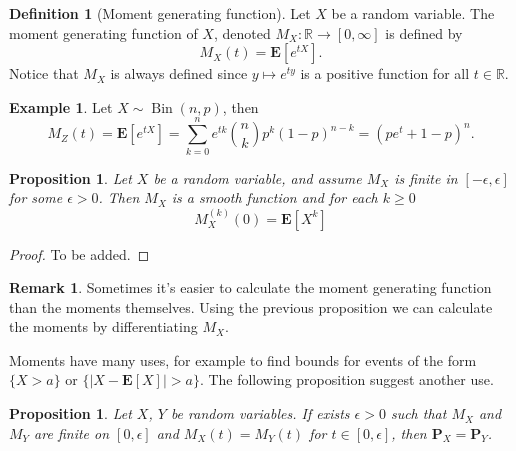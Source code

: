 \documentclass[11pt,a4paper]{article}
\theoremstyle{definition}
\newtheorem{definition}{Definition}[section]
\newtheorem{remark}{Remark}[section]
\newtheorem{example}{Example}[section]
\theoremstyle{plain}
\newtheorem{proposition}[theorem]{Proposition}
\DeclareMathOperator{\Bin}{Bin}
\newcommand{\R}{\mathbb{R}}
\newcommand{\abs}[1]{\left\lvert #1\right\rvert}
\begin{document}
  \begin{definition}[Moment generating function]
    Let $X$ be a random variable. The moment generating function of $X$,
    denoted $M_X \colon \R \to [0,\infty]$ is defined by
    \[
      M_X(t) = \mathbf E\left[e^{tX}\right].
    \]
    Notice that $M_X$ is always defined since $y \mapsto e^{ty}$ is a positive
    function for all $t \in \R$.
  \end{definition}

  \begin{example}
    Let $X \sim \Bin(n,p)$, then
    \[
      M_Z(t) =
      \mathbf E\left[e^{tX}\right] =
      \sum_{k=0}^{n}e^{t k}{\binom{n}{k}}p^{k}(1-p)^{n-k} =
      \left(p e^{t}+1-p\right)^{n}.
    \]
  \end{example}

  \begin{proposition}
    Let $X$ be a random variable, and assume $M_X$ is finite in 
    $[-\epsilon, \epsilon]$ for some $\epsilon > 0$. Then $M_X$ is a smooth
    function and for each $k \geq 0$
    \[
      M_X^{(k)}(0) = \mathbf E\left[X^k\right]
    \]
  \end{proposition}
  \begin{proof}
    To be added.
  \end{proof}

  \begin{remark}
    Sometimes it's easier to calculate the moment generating function than
    the moments themselves. Using the previous proposition we can calculate
    the moments by differentiating $M_X$.
  \end{remark}

  Moments have many uses, for example to find bounds for events of the
  form $\{X > a\}$ or $\{\abs{X - \mathbf E[X]} > a\}$. The following
  proposition suggest another use.

  \begin{proposition}
    Let $X$, $Y$ be random variables. If exists $\epsilon > 0$ such that 
    $M_X$ and $M_Y$ are finite on $[0,\epsilon]$ and $M_X(t) = M_Y(t)$
    for $t \in [0,\epsilon]$, then $\mathbf P_X = \mathbf P_Y$.
  \end{proposition}

  \newpage
\end{document}
